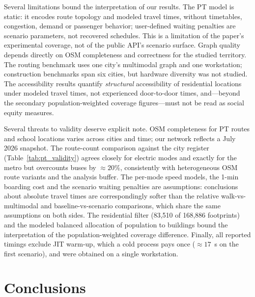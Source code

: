 \documentclass[smartcities,article,submit,moreauthors]{Definitions/mdpi}
\begin{document}
    Several limitations bound the interpretation of our results.
    The PT model is static: it encodes route topology and modeled travel times, without timetables,
    congestion, demand or passenger behavior; user-defined waiting penalties are scenario parameters,
    not recovered schedules.
    This is a limitation of the paper's experimental coverage, not of the public API's scenario
    surface.
    Graph quality depends directly on OSM completeness and correctness for the studied territory.
    The routing benchmark uses one city's multimodal graph and one workstation; construction benchmarks
    span six cities, but hardware diversity was not studied.
    The accessibility results quantify \emph{structural} accessibility of residential locations under
    modeled travel times, not experienced door-to-door times, and---beyond the secondary
    population-weighted coverage figures---must not be read as social equity measures.

    Several threats to validity deserve explicit note.
    OSM completeness for PT routes and school locations varies across cities and time; our network
    reflects a July 2026 snapshot. The route-count comparison against the city register
    (Table~\ref{tab:pt_validity}) agrees closely for electric modes and exactly for the metro but
    overcounts buses by ${\approx}20\%$, consistently with heterogeneous OSM route variants and the
    analysis buffer.
    The per-mode speed models, the 1-min boarding cost and the scenario waiting penalties are
    assumptions: conclusions about absolute travel times are correspondingly softer than the relative
    walk-vs-multimodal and baseline-vs-scenario comparisons, which share the same assumptions on both
    sides.
    The residential filter (83{,}510 of 168{,}886 footprints) and the modeled balanced allocation of
    population to buildings bound the interpretation of the population-weighted coverage difference.
    Finally, all reported timings exclude JIT warm-up, which a cold process pays once
    (${\approx}17$~s on the first scenario), and were obtained on a single workstation.



    \section{Conclusions}
    \label{sec:conclusions}
\end{document}
